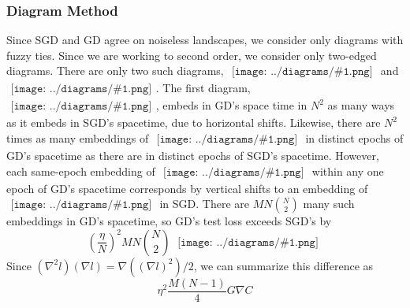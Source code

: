 \documentclass{article}
\newcommand{\wrap}[1]{\left(#1\right)}
\newcommand{\sdia}[1]{\begin{gathered}\texttt{[image: ../diagrams/\#1.png]}\end{gathered}}
\begin{document}
        \subsubsection*{Diagram Method}
            Since SGD and GD agree on noiseless landscapes, we consider only
            diagrams with fuzzy ties.  Since we are working to second order, we
            consider only two-edged diagrams.  There are only two such
            diagrams, $\sdia{(01-2)(02-12)}$ and $\sdia{(01-2)(01-12)}$.  The
            first diagram, $\sdia{(01-2)(02-12)}$, embeds in GD's space time in
            $N^2$ as many ways as it embeds in SGD's spacetime, due to
            horizontal shifts.  Likewise, there are $N^2$ times as many
            embeddings of $\sdia{(01-2)(02-12)}$ in distinct epochs of GD's
            spacetime as there are in distinct epochs of SGD's spacetime.
            However, each same-epoch embedding of $\sdia{(01-2)(01-12)}$ within
            any one epoch of GD's spacetime corresponds by vertical shifts to
            an embedding of $\sdia{(0-1-2)(01-12)}$ in SGD.  There are
            $MN{N\choose 2}$ many such embeddings in GD's spacetime, so GD's
            test loss exceeds SGD's by 
            $$
                \wrap{\frac{\eta}{N}}^2 MN{N\choose 2}~
                \sdia{c(01-2)(01-12)}
            $$
            Since $(\nabla^2 l) (\nabla l) = \nabla((\nabla l)^2)/2$, we can 
            summarize this difference as
            $$
                \eta^2 \frac{M(N-1)}{4} G \nabla C 
            $$
\end{document}
